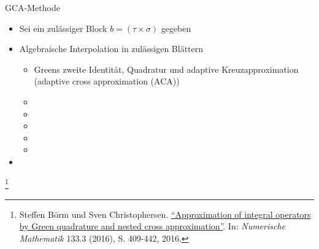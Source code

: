 \documentclass[10pt]{beamer}
\let\svthefootnote\thefootnote
\begin{document}
\begin{frame}{GCA-Methode}
  \begin{itemize}
    \item Sei ein zulässiger Block \(b = (\tau \times \sigma)\) gegeben
    \item Algebraische Interpolation in zulässigen Blättern
    \begin{itemize}
      \item Greens zweite Identität, Quadratur und adaptive Kreuzapproximation
            (adaptive cross approximation (ACA))
      \item {}
      \item {}
      \item {}
      \item {}
      \item {}
    \end{itemize}
    \item {}
  \end{itemize}

  \footnotesize
  \let\thefootnote\relax\footnote{Steffen Börm und Sven Christophersen.
  \href{https://link.springer.com/article/10.1007\%2Fs00211-015-0757-y}{
  ``Approximation of integral operators by Green quadrature and nested cross 
  approximation''}. In:   \textit{Numerische Mathematik} 133.3 (2016), S. 
  409-442, 2016.}
  \addtocounter{footnote}{-1}\let\thefootnote\svthefootnote\relax
  \normalsize
\end{frame}
\end{document}
